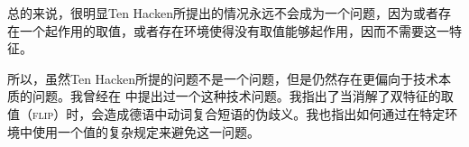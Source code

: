 总的来说，很明显Ten Hacken所提出的情况永远不会成为一个问题，因为或者存在一个起作用的取值，或者存在环境使得没有取值能够起作用，因而不需要这一特征。

所以，虽然Ten Hacken所提的问题不是一个问题，但是仍然存在更偏向于技术本质的问题。我曾经在 中提出过一个这种技术问题。我指出了当消解了双特征的取值（\textsc{flip}）时，会造成德语中动词复合短语的伪歧义。我也指出如何通过在特定环境中使用一个值的复杂规定来避免这一问题。


